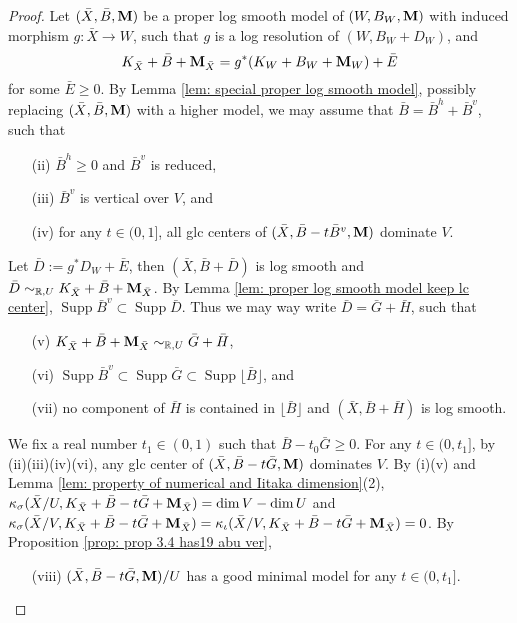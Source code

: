 \documentclass[11pt]{amsart}
\numberwithin{equation}{section}
\newcommand{\Mm}{{\bf{M}}}
\newcommand{\Rr}{\mathbb{R}}
\newcommand{\Supp}{\operatorname{Supp}}
\theoremstyle{definition}
\theoremstyle{definition}
\theoremstyle{definition}
\begin{document}
\begin{proof}
Let $(\bar X,\bar B,\Mm)$ be a proper log smooth model of $(W,B_W,\Mm)$ with induced morphism $g: \bar X\rightarrow W$, such that $g$ is a log resolution of $(W,B_W+D_W)$, and
$$K_{\bar X}+\bar B+\Mm_{\bar X}=g^*(K_W+B_W+\Mm_W)+\bar E$$
for some $\bar E\geq 0$.  By Lemma \ref{lem: special proper log smooth model}, possibly replacing $(\bar X,\bar B,\Mm)$ with a higher model, we may assume that $\bar B=\bar B^h+\bar B^v$, such that
\begin{itemize}
    \item[(ii)] $\bar B^h\geq 0$ and $\bar B^v$ is reduced,
    \item[(iii)] $\bar B^v$ is vertical over $V$, and
    \item[(iv)] for any $t\in (0,1]$, all glc centers of $(\bar X,\bar B-t\bar B^v,\Mm)$ dominate $V$.
\end{itemize}
Let $\bar D:=g^*D_W+\bar E$, then $(\bar X,\bar B+\bar D)$ is log smooth and $\bar D\sim_{\Rr,U}K_{\bar X}+\bar B+\Mm_{\bar X}$. By Lemma \ref{lem: proper log smooth model keep lc center}, $\Supp\bar B^v\subset\Supp\bar D$. Thus we may way write $\bar D=\bar G+\bar H$, such that
\begin{itemize}
    \item[(v)] $K_{\bar X}+\bar B+\Mm_{\bar X}\sim_{\Rr,U}\bar G+\bar H$,
    \item[(vi)] $\Supp\bar B^v\subset\Supp\bar G\subset\Supp\lfloor\bar B\rfloor$, and
    \item[(vii)] no component of $\bar H$ is contained in $\lfloor\bar B\rfloor$ and $(\bar X,\bar B+\bar H)$ is log smooth.
\end{itemize}
We fix a real number $t_1\in(0,1)$ such that $\bar B-t_0\bar G\geq 0$. For any $t\in (0,t_1]$, by (ii)(iii)(iv)(vi), any glc center of $(\bar X,\bar B-t\bar G,\Mm)$ dominates $V$. By (i)(v) and Lemma \ref{lem: property of numerical and Iitaka dimension}(2), $\kappa_{\sigma}(\bar X/U,K_{\bar X}+\bar B-t\bar G+\Mm_{\bar X})=\dim V-\dim U$ and $\kappa_{\sigma}(\bar X/V,K_{\bar X}+\bar B-t\bar G+\Mm_{\bar X})=\kappa_{\iota}(\bar X/V,K_{\bar X}+\bar B-t\bar G+\Mm_{\bar X})=0$. By Proposition \ref{prop: prop 3.4 has19 abu ver},
\begin{itemize}
    \item[(viii)] $(\bar X,\bar B-t\bar G,\Mm)/U$ has a good minimal model for any $t\in (0,t_1]$.
\end{itemize}


\end{proof}
\end{document}
